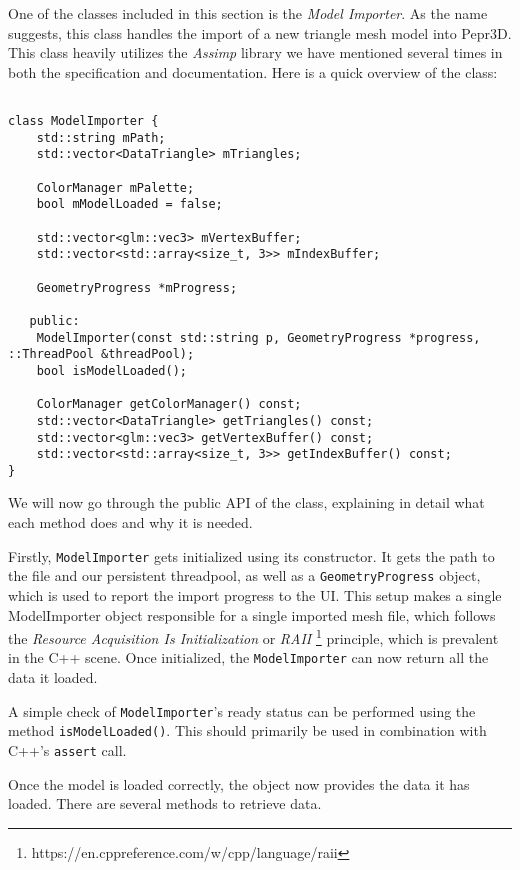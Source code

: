 One of the classes included in this section is the \textit{Model Importer}. As the name suggests, this class handles the import of a new triangle mesh model into Pepr3D. This class heavily utilizes the \textit{Assimp} library we have mentioned several times in both the specification and documentation. Here is a quick overview of the class:

\begin{lstlisting}

class ModelImporter {
    std::string mPath;
    std::vector<DataTriangle> mTriangles;

    ColorManager mPalette;
    bool mModelLoaded = false;

    std::vector<glm::vec3> mVertexBuffer;
    std::vector<std::array<size_t, 3>> mIndexBuffer;

    GeometryProgress *mProgress;

   public:
    ModelImporter(const std::string p, GeometryProgress *progress, ::ThreadPool &threadPool);
    bool isModelLoaded();

    ColorManager getColorManager() const;
    std::vector<DataTriangle> getTriangles() const;
    std::vector<glm::vec3> getVertexBuffer() const;
    std::vector<std::array<size_t, 3>> getIndexBuffer() const;
}

\end{lstlisting}

We will now go through the public API of the class, explaining in detail what each method does and why it is needed.

Firstly, \texttt{ModelImporter} gets initialized using its constructor. It gets the path to the file and our persistent threadpool, as well as a \texttt{GeometryProgress} object, which is used to report the import progress to the UI. This setup makes a single ModelImporter object responsible for a single imported mesh file, which follows the \textit{Resource Acquisition Is Initialization} or \textit{RAII} \footnote{https://en.cppreference.com/w/cpp/language/raii} principle, which is prevalent in the C++ scene. Once initialized, the \texttt{ModelImporter} can now return all the data it loaded.

A simple check of \texttt{ModelImporter}'s ready status can be performed using the method \texttt{isModelLoaded()}. This should primarily be used in combination with C++'s \texttt{assert} call.

Once the model is loaded correctly, the object now provides the data it has loaded. There are several methods to retrieve data.

